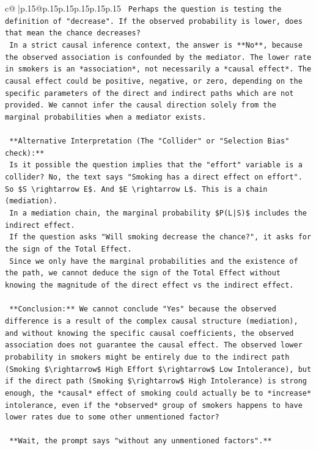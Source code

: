 \documentclass{article}
\begin{document}
{\begin{supertabular}{c@{$\;$}|p{.15\linewidth}@{}p{.15\linewidth}p{.15\linewidth}p{.15\linewidth}p{.15\linewidth}p{.15\linewidth}}
{{{\texttt{    Perhaps the question is testing the definition of "decrease". If the observed probability is lower, does that mean the chance decreases?} \\
\texttt{    In a strict causal inference context, the answer is **No**, because the observed association is confounded by the mediator. The lower rate in smokers is an *association*, not necessarily a *causal effect*. The causal effect could be positive, negative, or zero, depending on the specific parameters of the direct and indirect paths which are not provided. We cannot infer the causal direction solely from the marginal probabilities when a mediator exists.} \\
\\ 
\texttt{    **Alternative Interpretation (The "Collider" or "Selection Bias" check):**} \\
\texttt{    Is it possible the question implies that the "effort" variable is a collider? No, the text says "Smoking has a direct effect on effort". So \$S \textbackslash{}rightarrow E\$. And \$E \textbackslash{}rightarrow L\$. This is a chain (mediation).} \\
\texttt{    In a mediation chain, the marginal probability \$P(L|S)\$ includes the indirect effect.} \\
\texttt{    If the question asks "Will smoking decrease the chance?", it asks for the sign of the Total Effect.} \\
\texttt{    Since we only have the marginal probabilities and the existence of the path, we cannot deduce the sign of the Total Effect without knowing the magnitude of the direct effect vs the indirect effect.} \\
\\ 
\texttt{    **Conclusion:** We cannot conclude "Yes" because the observed difference is a result of the complex causal structure (mediation), and without knowing the specific causal coefficients, the observed association does not guarantee the causal effect. The observed lower probability in smokers might be entirely due to the indirect path (Smoking \$\textbackslash{}rightarrow\$ High Effort \$\textbackslash{}rightarrow\$ Low Intolerance), but if the direct path (Smoking \$\textbackslash{}rightarrow\$ High Intolerance) is strong enough, the *causal* effect of smoking could actually be to *increase* intolerance, even if the *observed* group of smokers happens to have lower rates due to some other unmentioned factor?} \\
\\ 
\texttt{    **Wait, the prompt says "without any unmentioned factors".**} \\
}}}
\end{supertabular}}
\end{document}
